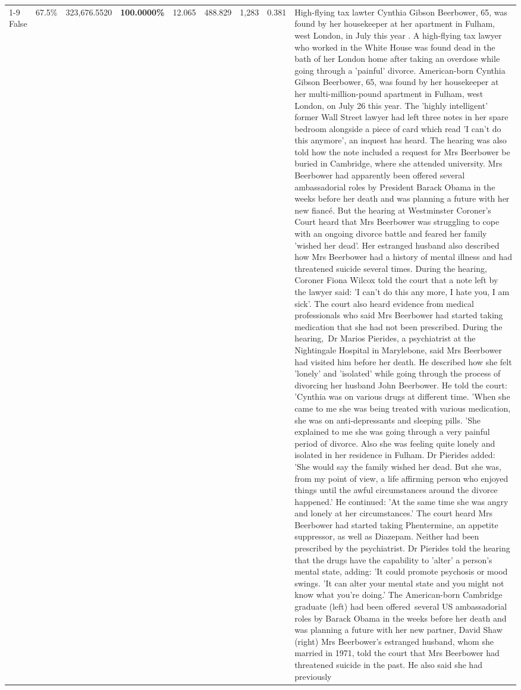 \begin{table}[H]
\begin{tabular}{lllrlllll}
\cline{1-9}
False & 67.5\% & 323,676.5520 & \bfseries \color{red} 100.0000\% & 12.065 & 488.829 & 1,283 & 0.381 & High-flying tax lawter Cynthia Gibson Beerbower, 65, was found by her housekeeper at her apartment in Fulham, west London, in July this year . A high-flying tax lawyer who worked in the White House was found dead in the bath of her London home after taking an overdose while going through a 'painful' divorce. American-born Cynthia Gibson Beerbower, 65, was found by her housekeeper at her multi-million-pound apartment in Fulham, west London, on July 26 this year. The 'highly intelligent' former Wall Street lawyer had left three notes in her spare bedroom alongside a piece of card which read 'I can't do this anymore', an inquest has heard. The hearing was also told how the note included a request for Mrs Beerbower be buried in Cambridge, where she attended university. Mrs Beerbower had apparently been offered several ambassadorial roles by President Barack Obama in the weeks before her death and was planning a future with her new fiancé. But the hearing at Westminster Coroner's Court heard that Mrs Beerbower was struggling to cope with an ongoing divorce battle and feared her family 'wished her dead'. Her estranged husband also described how Mrs Beerbower had a history of mental illness and had threatened suicide several times. During the hearing, Coroner Fiona Wilcox told the court that a note left by the lawyer said: 'I can't do this any more, I hate you, I am sick'. The court also heard evidence from medical professionals who said Mrs Beerbower had started taking medication that she had not been prescribed. During the hearing, Dr Marios Pierides, a psychiatrist at the Nightingale Hospital in Marylebone, said Mrs Beerbower had visited him before her death. He described how she felt 'lonely' and 'isolated' while going through the process of divorcing her husband John Beerbower. He told the court: 'Cynthia was on various drugs at different time. 'When she came to me she was being treated with various medication, she was on anti-depressants and sleeping pills. 'She explained to me she was going through a very painful period of divorce. Also she was feeling quite lonely and isolated in her residence in Fulham. Dr Pierides added: 'She would say the family wished her dead. But she was, from my point of view, a life affirming person who enjoyed things until the awful circumstances around the divorce happened.' He continued: 'At the same time she was angry and lonely at her circumstances.' The court heard Mrs Beerbower had started taking Phentermine, an appetite suppressor, as well as Diazepam. Neither had been prescribed by the psychiatrist. Dr Pierides told the hearing that the drugs have the capability to 'alter' a person's mental state, adding: 'It could promote psychosis or mood swings. 'It can alter your mental state and you might not know what you're doing.' The American-born Cambridge graduate (left) had been offered several US ambassadorial roles by Barack Obama in the weeks before her death and was planning a future with her new partner, David Shaw (right) Mrs Beerbower's estranged husband, whom she married in 1971, told the court that Mrs Beerbower had threatened suicide in the past. He also said she had previously 
\end{tabular}
\end{table}
